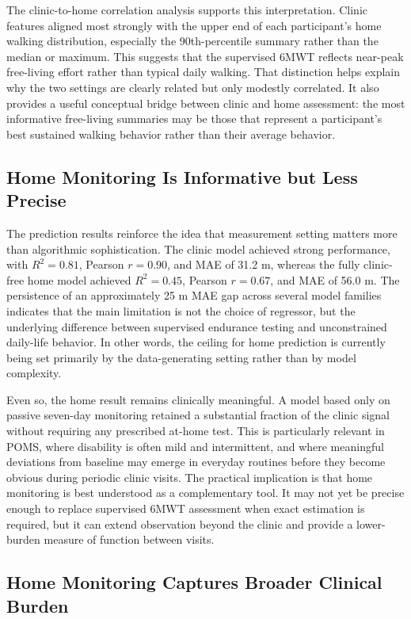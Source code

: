 \documentclass{article}
\begin{document}
The clinic-to-home correlation analysis supports this interpretation. Clinic features aligned most strongly with the upper end of each participant's home walking distribution, especially the 90th-percentile summary rather than the median or maximum. This suggests that the supervised 6MWT reflects near-peak free-living effort rather than typical daily walking. That distinction helps explain why the two settings are clearly related but only modestly correlated. It also provides a useful conceptual bridge between clinic and home assessment: the most informative free-living summaries may be those that represent a participant's best sustained walking behavior rather than their average behavior.

\subsection{Home Monitoring Is Informative but Less Precise}

The prediction results reinforce the idea that measurement setting matters more than algorithmic sophistication. The clinic model achieved strong performance, with $R^2 = 0.81$, Pearson $r = 0.90$, and MAE of 31.2 m, whereas the fully clinic-free home model achieved $R^2 = 0.45$, Pearson $r = 0.67$, and MAE of 56.0 m. The persistence of an approximately 25 m MAE gap across several model families indicates that the main limitation is not the choice of regressor, but the underlying difference between supervised endurance testing and unconstrained daily-life behavior. In other words, the ceiling for home prediction is currently being set primarily by the data-generating setting rather than by model complexity.

Even so, the home result remains clinically meaningful. A model based only on passive seven-day monitoring retained a substantial fraction of the clinic signal without requiring any prescribed at-home test. This is particularly relevant in POMS, where disability is often mild and intermittent, and where meaningful deviations from baseline may emerge in everyday routines before they become obvious during periodic clinic visits. The practical implication is that home monitoring is best understood as a complementary tool. It may not yet be precise enough to replace supervised 6MWT assessment when exact estimation is required, but it can extend observation beyond the clinic and provide a lower-burden measure of function between visits.

\subsection{Home Monitoring Captures Broader Clinical Burden}
\end{document}
